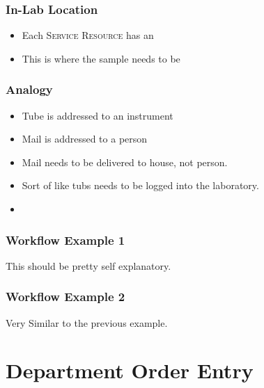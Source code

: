     \subsection{In-Lab Location}
    \begin{itemize}
        \item Each \textsc{Service Resource} has an 
        \item This is where the sample needs to be 
    \end{itemize}
    \subsection{Analogy}
        \begin{itemize}
            \item Tube is addressed to an instrument
            \item Mail is addressed to a person
            \item Mail needs to be delivered to house, not person.
            \item Sort of like tubs needs to be logged into the laboratory.
            \item {}
        \end{itemize}

    \subsection{Workflow Example 1}
        This should be pretty self explanatory.


    \subsection{Workflow Example 2}
        Very Similar to the previous example.



\chapter{Department Order Entry}
